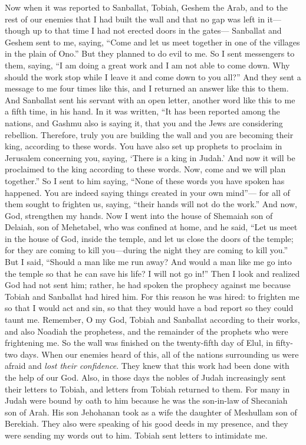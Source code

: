 \begin{biblechapter} %
 Now when it was reported to Sanballat, Tobiah, Geshem the Arab, and to the rest of our enemies that I had built the wall and that no gap was left in it—though up to that time I had not erected doors in the gates—
\verse Sanballat and Geshem sent to me, saying, “Come and let us meet together in one of the villages in the plain of Ono.” But they planned to do evil to me.
\verse So I sent messengers to them, saying, “I am doing a great work and I am not able to come down. Why should the work stop while I leave it and come down to you all?”
\verse And they sent a message to me four times like this, and I returned an answer like this to them.
\verse And Sanballat sent his servant with an open letter, another word like this to me a fifth time, in his hand.
\verse In it was written, “It has been reported among the nations, and Gashmu also is saying it, that you and the Jews are considering rebellion. Therefore, truly you are building the wall and you are becoming their king, according to these words.
\verse You have also set up prophets to proclaim in Jerusalem concerning you, saying, ‘There is a king in Judah.’ And now it will be proclaimed to the king according to these words. Now, come and we will plan together.”
\verse So I sent to him saying, “None of these words you have spoken has happened. You are indeed saying things created in your own mind”—
\verse for all of them sought to frighten us, saying, “their hands will not do the work.” And now, God, strengthen my hands.
\verse Now I went into the house of Shemaiah son of Delaiah, son of Mehetabel, who was confined at home, and he said, “Let us meet in the house of God, inside the temple, and let us close the doors of the temple; for they are coming to kill you—during the night they are coming to kill you.”
\verse But I said, “Should a man like me run away? And would a man like me go into the temple so that he can save his life? I will not go in!”
\verse Then I look and realized God had not sent him; rather, he had spoken the prophecy against me because Tobiah and Sanballat had hired him.
\verse For this reason he was hired: to frighten me so that I would act and sin, so that they would have a bad report so they could taunt me.
\verse Remember, O my God, Tobiah and Sanballat according to their works, and also Noadiah the prophetess, and the remainder of the prophets who were frightening me.
 So the wall was finished on the twenty-fifth day of Elul, in fifty-two days.
\verse When our enemies heard of this, all of the nations surrounding us were afraid and \textit{lost their confidence}. They knew that this work had been done with the help of our God.
\verse Also, in those days the nobles of Judah increasingly sent their letters to Tobiah, and letters from Tobiah returned to them.
\verse For many in Judah were bound by oath to him because he was the son-in-law of Shecaniah son of Arah. His son Jehohanan took as a wife the daughter of Meshullam son of Berekiah.
\verse They also were speaking of his good deeds in my presence, and they were sending my words out to him. Tobiah sent letters to intimidate me.
\end{biblechapter}

